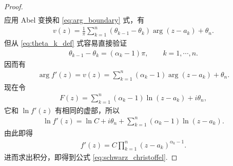 \documentclass[../../main.tex]{subfiles}%
\begin{document}
\begin{proof}
\begin{align*}
\end{align*}
应用 Abel 变换和 \eqref{eq:arg_boundary} 式，有
\begin{align*}
v(z)=\frac{1}{\pi}\sum_{k=1}^{n}(\theta_{k-1}-\theta_k)\arg(z-a_k)+\theta_n.
\end{align*}
但从 \eqref{eq:theta_k_def} 式容易直接验证
\begin{align*}
\theta_{k-1}-\theta_k=(\alpha_k-1)\pi, \qquad k=1,\cdots,n.
\end{align*}
因而有
\begin{align*}
\arg f'(z)=v(z)=\sum_{k=1}^{n}(\alpha_k-1)\arg(z-a_k)+\theta_n.
\end{align*}
现在令
\begin{align*}
F(z)=\sum_{k=1}^{n}(\alpha_k-1)\ln(z-a_k)+i\theta_n,
\end{align*}
它和 \(\ln f'(z)\) 有相同的虚部，所以
\begin{align*}
\ln f'(z)=\ln C+i\theta_n+\sum_{k=1}^{n}(\alpha_k-1)\ln(z-a_k).
\end{align*}
由此即得
\begin{align*}
f'(z)=C\prod_{k=1}^{n}(z-a_k)^{\alpha_k-1}.
\end{align*}
进而求出积分，即得到公式 \eqref{eq:schwarz_christoffel}.
\end{proof}
\end{document}
